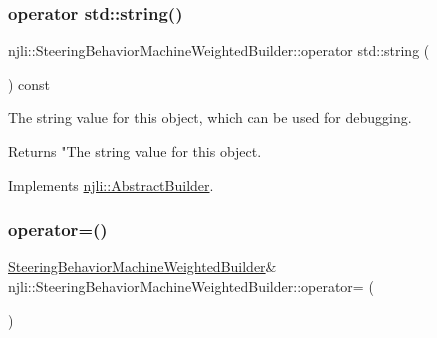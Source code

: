 \subsubsection{\texorpdfstring{operator std\+::string()}{operator std::string()}}
{\footnotesize\ttfamily njli\+::\+Steering\+Behavior\+Machine\+Weighted\+Builder\+::operator std\+::string (\begin{DoxyParamCaption}{ }\end{DoxyParamCaption}) const\hspace{0.3cm}{\ttfamily [virtual]}}

The string value for this object, which can be used for debugging.

\begin{DoxyReturn}{Returns}
"The string value for this object. 
\end{DoxyReturn}


Implements \mbox{\hyperlink{classnjli_1_1_abstract_builder_a3e6e553e06d1ca30517ad5fb0bd4d000}{njli\+::\+Abstract\+Builder}}.

\mbox{\label{classnjli_1_1_steering_behavior_machine_weighted_builder_a85ba138993f1c1e1c4acd808e21e0716}} 
\subsubsection{\texorpdfstring{operator=()}{operator=()}}
{\footnotesize\ttfamily \mbox{\hyperlink{classnjli_1_1_steering_behavior_machine_weighted_builder}{Steering\+Behavior\+Machine\+Weighted\+Builder}}\& njli\+::\+Steering\+Behavior\+Machine\+Weighted\+Builder\+::operator= (\begin{DoxyParamCaption}\item[{const \mbox{\hyperlink{classnjli_1_1_steering_behavior_machine_weighted_builder}{Steering\+Behavior\+Machine\+Weighted\+Builder}} \&}]{ }\end{DoxyParamCaption})\hspace{0.3cm}{\ttfamily [protected]}}

\mbox{\label{classnjli_1_1_steering_behavior_machine_weighted_builder_ae5bca162b52a56eb8369e770e2af4c31}} 
